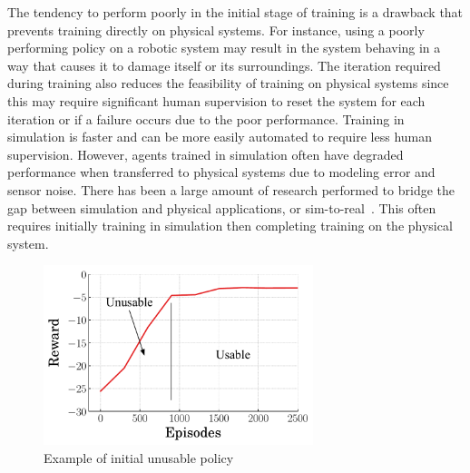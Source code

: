 The tendency to perform poorly in the initial stage of training is a drawback that prevents training directly on physical systems. For instance, using a poorly performing policy on a robotic system may result in the system behaving in a way that causes it to damage itself or its surroundings.
The iteration required during training also reduces the feasibility of training on physical systems since this may require significant human supervision to reset the system for each iteration or if a failure occurs due to the poor performance. Training in simulation is faster and can be more easily automated to require less human supervision.
%
However, agents trained in simulation often have degraded performance when transferred to physical systems due to modeling error and sensor noise.
There has been a large amount of research performed to bridge the gap between simulation and physical applications, or sim-to-real~\cite{Peng2018a,Zhao:2020a}. This often requires initially training in simulation then completing training on the physical system.

%
\begin{figure}[tb]
\begin{center}
\includegraphics[width = 0.7\textwidth]{figures/figures_introduction/long_training_time}
\caption{Example of initial unusable policy} 
\label{fig_chap1:long_training_time}
\end{center}
\end{figure}
%

